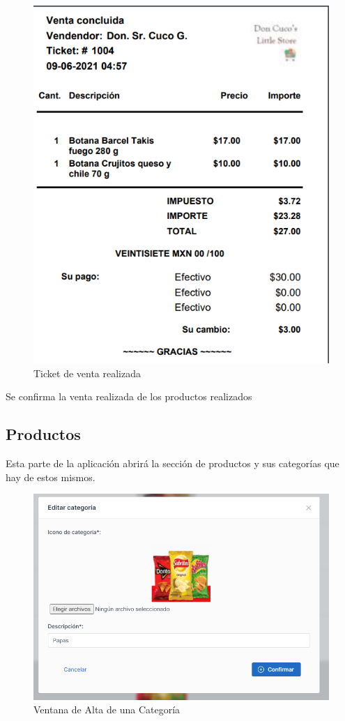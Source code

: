 \documentclass[a4paper,DIV=12]{scrreprt}
\begin{document}
	\begin{figure}[!htb]
		\centering
		\includegraphics[scale=0.4]{VENTAS9.PNG}
		\caption{Ticket de venta realizada}
	\end{figure}
Se confirma la venta realizada de los productos realizados\\
	
\subsection{Productos}
 Esta parte de la aplicación abrirá la sección de productos y sus categorías que hay de estos mismos.\\
	
	\begin{figure}[!htb]
		\centering
		\includegraphics[scale=0.4]{ALTACATEGORIA.PNG}
		\caption{Ventana de Alta de una Categoría}
	\end{figure}
	
\end{document}
